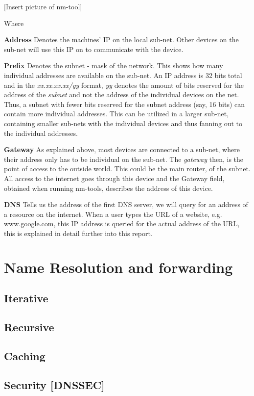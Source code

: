 [Insert picture of nm-tool]

Where 

\textbf{Address} 
Denotes the machines' IP on the local sub-net. Other devices on the sub-net will use this IP on to communicate with the device.

\textbf{Prefix} 
Denotes the subnet - mask of the network. This shows how many individual addresses are available on the sub-net. An IP address is 32 bits total and in the \textit{xx.xx.xx.xx/yy} format, \textit{yy} denotes the amount of bits reserved for the address of the \textit{subnet} and not the address of the individual devices on the net. Thus, a subnet with fewer bits reserved for the subnet address (say, 16 bits) can contain more individual addresses. This can be utilized in a larger sub-net, containing smaller sub-nets with the individual devices and thus fanning out to the individual addresses. 

\textbf{Gateway}
As explained above, most devices are connected to a sub-net, where their address only has to be individual on the sub-net. The \textit{gateway} then, is the point of access to the outside world. This could be the main router, of the subnet. All access to the internet goes through this device and the Gateway field, obtained when running nm-tools, describes the address of this device. 

\textbf{DNS}
Tells us the address of the first DNS server, we will query for an address of a resource on the internet. When a user types the URL of a website, e.g. www.google.com, this IP address is queried for the actual address of the URL, this is explained in detail further into this report.


\section{Name Resolution and forwarding}
\subsection{Iterative}
\subsection{Recursive}
\subsection{Caching}
\subsection{Security [DNSSEC]}
